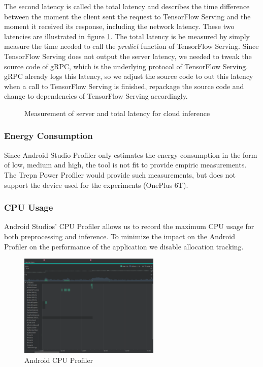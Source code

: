 The second latency is called the total latency and describes the time difference between the moment the client sent the request to TensorFlow Serving and the moment it received its response, including the network latency.
These two latencies are illustrated in figure \ref{fig:serverLat}.
The total latency is be measured by simply measure the time needed to call the \emph{predict} function of TensorFlow Serving.
Since TensorFlow Serving does not output the server latency, we needed to tweak the source code of gRPC, which is the underlying protocol of TensorFlow Serving. gRPC already logs this latency, so we adjust the source code to out this latency when a call to TensorFlow Serving is finished, repackage the source code and change to dependencies of TensorFlow Serving accordingly.
\begin{figure}[H]
\centering

\caption{Measurement of server and total latency for cloud inference}
\label{fig:serverLat}
\end{figure}
\subsubsection{Energy Consumption}
Since Android Studio Profiler only estimates the energy consumption in the form of low, medium and high, the tool is not fit to provide empiric measurements. The Trepn Power Profiler would provide such measurements, but does not support the device used for the experiments (OnePlus 6T).
\subsubsection{CPU Usage}
Android Studios’ CPU Profiler allows us to record the maximum CPU usage for both preprocessing and inference. To minimize the impact on the Android Profiler on the performance of the application we disable allocation tracking.
\begin{figure}[H]
\centering  
\includegraphics[width=0.6\textwidth]{./Bilder/profiler_CPU}
\caption{Android CPU Profiler}
\label{fig:prof_cpu}
\end{figure}
